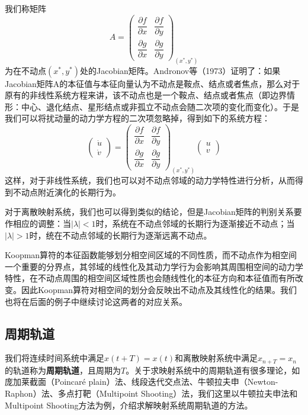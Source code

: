 我们称矩阵
\begin{equation}
    A=\begin{pmatrix}
        \dfrac{\partial f}{\partial x} & \dfrac{\partial f}{\partial y} \\
        \dfrac{\partial g}{\partial x} & \dfrac{\partial g}{\partial y}
    \end{pmatrix}_{(x^*,y^*)}
\end{equation}
为在不动点$(x^*,y^*)$处的Jacobian矩阵。Andronov等（1973）证明了：如果Jacobian矩阵A的本征值与本征向量认为不动点是鞍点、结点或者焦点，那么对于原有的非线性系统方程来讲，该不动点也是一个鞍点、结点或者焦点（即边界情形：中心、退化结点、星形结点或非孤立不动点会随二次项的变化而变化）。于是我们可以将扰动量的动力学方程的二次项忽略掉，得到如下的系统方程：
\begin{equation}
    \begin{pmatrix}
        \dot{u}\\
        \dot{v}
    \end{pmatrix}=
    \begin{pmatrix}
        \dfrac{\partial f}{\partial x} & \dfrac{\partial f}{\partial y} \\
        \dfrac{\partial g}{\partial x} & \dfrac{\partial g}{\partial y}
    \end{pmatrix}_{(x^*,y^*)}
    \begin{pmatrix}
        u\\v
    \end{pmatrix}
\end{equation}
这样，对于非线性系统，我们也可以对不动点邻域的动力学特性进行分析，从而得到不动点附近演化的长期行为。

对于离散映射系统，我们也可以得到类似的结论，但是Jacobian矩阵的判别关系要作相应的调整：当$|\lambda|<1$时，系统在不动点邻域的长期行为逐渐接近不动点；当$|\lambda|>1$时，统在不动点邻域的长期行为逐渐远离不动点。

Koopman算符的本征函数能够划分相空间区域的不同性质，而不动点作为相空间一个重要的分界点，其邻域的线性化及其动力学行为会影响其周围相空间的动力学特性，在不动点周围的相空间区域性质也会随线性化的本征方向和本征值而有所改变。因此Koopman算符对相空间的划分会反映出不动点及其线性化的结果。我们也将在后面的例子中继续讨论这两者的对应关系。

\subsection{周期轨道}

我们将连续时间系统中满足$x(t+T)=x(t)$和离散映射系统中满足$x_{n+T}=x_n$的轨道称为\textbf{周期轨道}，且周期为$T$。关于求映射系统中的周期轨道有很多理论，如庞加莱截面（Poincar\'{e} plain）法、线段迭代交点法、牛顿拉夫申（Newton-Raphon）法、多点打靶（Multipoint Shooting）法，我们这里以牛顿拉夫申法和Multipoint Shooting方法为例，介绍求解映射系统周期轨道的方法。

